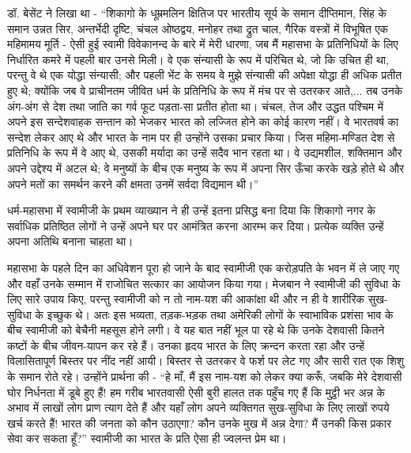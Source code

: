 डॉ. बेसेंट ने लिखा था - “शिकागो के धूम्रमलिन क्षितिज पर भारतीय सूर्य के समान दीप्तिमान, सिंह के समान उन्नत सिर, अन्तर्भेदी दृष्टि, चंचल ओष्ठद्वय, मनोहर तथा द्रुत चाल, गैरिक वस्त्रों में विभूषित एक महिमामय मूर्ति - ऐसी हुई स्वामी विवेकानन्द के बारे में मेरी धारणा, जब मैं महासभा के प्रतिनिधियों के लिए निर्धारित कमरे में पहली बार उनसे मिली। वे एक संन्यासी के रूप में परिचित थे, जो कि उचित ही था, परन्तु वे थे एक योद्धा संन्यासी; और पहली भेंट के समय वे मुझे संन्यासी की अपेक्षा योद्धा ही अधिक प्रतीत हुए थे; क्योंकि जब वे प्राचीनतम जीवित धर्म के प्रतिनिधि के रूप में मंच पर से उतरकर आते,... तब उनके अंग-अंग से देश तथा जाति का गर्व फूट पड़ता-सा प्रतीत होता था। चंचल, तेज और उद्धत पश्चिम में अपने इस सन्देशवाहक सन्तान को भेजकर भारत को लज्जित होने का कोई कारण नहीं। वे भारतवर्ष का सन्देश लेकर आए थे और भारत के नाम पर ही उन्होंने उसका प्रचार किया। जिस महिमा-मण्डित देश से प्रतिनिधि के रूप में वे आए थे, उसकी मर्यादा का उन्हें सदैव भान रहता था। वे उद्यमशील, शक्तिमान और अपने उद्देश्य में अटल थे; वे मनुष्यों के बीच एक मनुष्य के रूप में अपना सिर ऊँचा करके खड़े होते थे और अपने मतों का समर्थन करने की क्षमता उनमें सर्वदा विद्यमान थी।” 

\delimiter

धर्म-महासभा में स्वामीजी के प्रथम व्याख्यान ने ही उन्हें इतना प्रसिद्ध बना दिया कि शिकागो नगर के सर्वाधिक प्रतिष्ठित लोगों ने उन्हें अपने घर पर आमंत्रित करना आरम्भ कर दिया। प्रत्येक व्यक्ति उन्हें अपना अतिथि बनाना चाहता था। 

महासभा के पहले दिन का अधिवेशन पूरा हो जाने के बाद स्वामीजी एक करोड़पति के भवन में ले जाए गए और वहाँ उनके सम्मान में राजोचित सत्कार का आयोजन किया गया। मेजबान ने स्वामीजी की सुविधा के लिए सारे उपाय किए, परन्तु स्वामीजी को न तो नाम-यश की आकांक्षा थी और न ही वे शारीरिक सुख-सुविधा के इच्छुक थे। अतः इस भव्यता, तड़क-भड़क तथा अमेरिकी लोगों के स्वाभाविक प्रशंसा भाव के बीच स्वामीजी को बेचैनी महसूस होने लगी। वे यह बात नहीं भूल पा रहे थे कि उनके देशवासी कितने कष्टों के बीच जीवन-यापन कर रहे हैं। उनका हृदय भारत के लिए क्रन्दन करता रहा और उन्हें विलासितापूर्ण बिस्तर पर नींद नहीं आयी। बिस्तर से उतरकर वे फर्श पर लेट गए और सारी रात एक शिशु के समान रोते रहे। उन्होंने प्रार्थना की - “हे माँ, मैं इस नाम-यश को लेकर क्या करूँ, जबकि मेरे देशवासी घोर निर्धनता में डूबे हुए हैं! हम गरीब भारतवासी ऐसी बुरी हालत तक पहुँच गए हैं कि मुट्ठी भर अन्न के अभाव में लाखों लोग प्राण त्याग देते हैं और यहाँ लोग अपने व्यक्तिगत सुख-सुविधा के लिए लाखों रुपये खर्च करते हैं! भारत की जनता को कौन उठाएगा? कौन उनके मुख में अन्न देगा? मैं उनकी किस प्रकार सेवा कर सकता हूँ?” स्वामीजी का भारत के प्रति ऐसा ही ज्वलन्त प्रेम था। 

